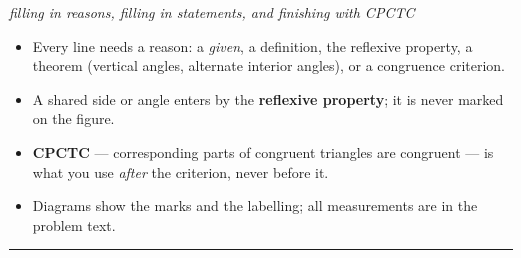\documentclass[12pt]{article}
\begin{document}

\begin{center}\small\textit{filling in reasons, filling in statements, and finishing with CPCTC}\end{center}

\begin{itemize}[leftmargin=0.8cm, itemsep=1pt, topsep=2pt]
  \item Every line needs a reason: a \emph{given}, a definition, the reflexive property, a theorem (vertical angles, alternate interior angles), or a congruence criterion.
  \item A shared side or angle enters by the \textbf{reflexive property}; it is never marked on the figure.
  \item \textbf{CPCTC} --- corresponding parts of congruent triangles are congruent --- is what you use \emph{after} the criterion, never before it.
  \item Diagrams show the marks and the labelling; all measurements are in the problem text.
\end{itemize}

\vspace{0.2cm}\noindent\rule{\linewidth}{0.4pt}
\end{document}

